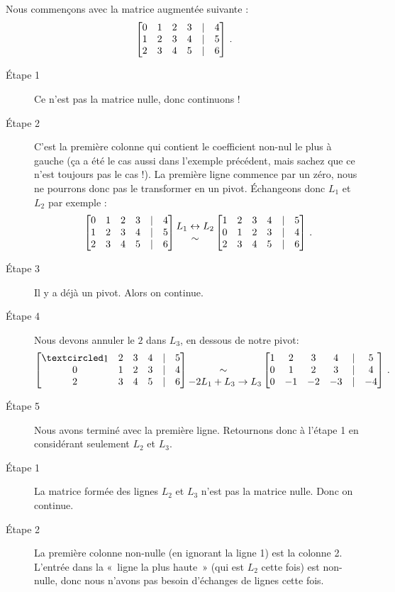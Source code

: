 \begin{myexample} Nous commençons avec la matrice augmentée suivante : 
$$
\left[ \begin{matrix} 0 & 1 & 2 & 3&|& 4\\
1 & 2 & 3 & 4 &|& 5\\
2 & 3 & 4 & 5 & |& 6 \end{matrix} \right]\,.
$$
\begin{description}
\item[Étape 1]  Ce n'est pas la matrice nulle, donc continuons !
\item[Étape 2]   C'est la première colonne qui contient le coefficient non-nul le plus à gauche (ça a été le cas aussi dans l'exemple précédent, mais sachez que ce n'est toujours pas le cas !).  
La première ligne commence par un zéro, nous ne pourrons donc pas le transformer en un pivot. Échangeons donc $L_1$ et $L_2$ par exemple :
$$\left[ \begin{matrix} 0 & 1 & 2 & 3&|& 4\\
1 & 2 & 3 & 4 &|& 5\\
2 & 3 & 4 & 5 & |& 6 \end{matrix} \right]
\begin{matrix} L_1 \leftrightarrow L_2 \\ \sim \end{matrix}
\left[ \begin{matrix} 
1 & 2 & 3 & 4 &|& 5\\
0 & 1 & 2 & 3 &|& 4\\
2 & 3 & 4 & 5 & |& 6 \end{matrix} \right]\,.
$$
\item[Étape 3] Il y a déjà un pivot. Alors on continue.

\item[Étape 4] Nous devons annuler le $2$ dans $L_3$, en dessous de notre pivot:
$$\mat{
\pivot & 2 & 3 & 4 &|& 5\\
0 & 1 & 2 & 3 &|& 4\\
2 & 3 & 4 & 5 & |& 6}
\mt{\\\sim\ \\ -2L_1+L_3\to L_3}
\mat{
1 & 2 & 3 & 4 &|& 5\\
0 & 1 & 2 & 3 &|& 4\\
0 & -1 & -2 & -3 & |& -4}\,.
$$
\item[Étape 5] Nous avons terminé avec la première ligne.
Retournons donc à l'étape 1 en considérant seulement $L_2$ et $L_3$.

\item[Étape 1]  La matrice formée des lignes $L_2$ et $L_3$ n'est pas la matrice nulle. Donc on continue.

\item[Étape 2] La première colonne non-nulle (en ignorant la ligne 1) est la colonne 2.  L'entrée dans la «~ligne la plus haute~» (qui est $L_2$ cette fois) est non-nulle, donc nous n'avons pas besoin d'échanges de lignes cette fois.


\end{description}
\end{myexample}
